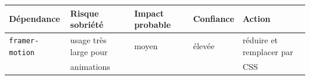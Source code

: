 \documentclass[
  10pt,
  a4paper,
  DIV=11,
  numbers=noendperiod,
  oneside]{scrreprt}
\newcounter{none} %
\begin{document}
{\def\LTcaptype{none} %
\begin{longtable}[]{@{}
  >{\raggedright\arraybackslash}p{}
  >{\raggedright\arraybackslash}p{}
  >{\raggedright\arraybackslash}p{}
  >{\raggedright\arraybackslash}p{}
  >{\raggedright\arraybackslash}p{}@{}}
\toprule\noalign{}
\begin{minipage}[b]{\linewidth}\raggedright
Dépendance
\end{minipage} & \begin{minipage}[b]{\linewidth}\raggedright
Risque sobriété
\end{minipage} & \begin{minipage}[b]{\linewidth}\raggedright
Impact probable
\end{minipage} & \begin{minipage}[b]{\linewidth}\raggedright
Confiance
\end{minipage} & \begin{minipage}[b]{\linewidth}\raggedright
Action
\end{minipage} \\
\midrule\noalign{}
\endhead
\bottomrule\noalign{}
\endlastfoot
\texttt{framer-motion} & usage très large pour & moyen & élevée &
réduire et remplacer par \\
& animations & & & CSS \\
\end{longtable}
}
\end{document}
